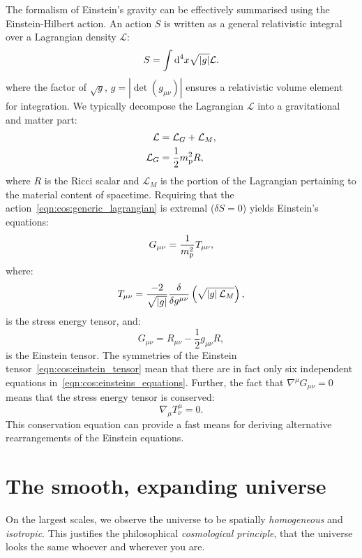 The formalism of Einstein's gravity can be effectively summarised using the Einstein-Hilbert action. An action $S$ is written as a general relativistic integral over a Lagrangian density $\mathcal{L}$:
\begin{equation}
  S = \int\d[4]{x} \sqrt{|g|} \mathcal{L}.
  \label{eqn:cos:generic_lagrangian}
\end{equation}
where the factor of $\sqrt{g}$, $g=\left|\det\left( g_{\mu\nu} \right)\right|$ ensures a relativistic volume element for integration.
We typically decompose the Lagrangian $\mathcal{L}$ into a gravitational and matter part:
\begin{align}
  \mathcal{L} &= \mathcal{L}_G + \mathcal{L}_M,
  \label{eqn:cos:decomp}\\
  \mathcal{L}_G &= \frac{1}{2} \m^2 R,
  \label{eqn:cos:L_grav}
\end{align}
where $R$ is the Ricci scalar and $\mathcal{L}_M$ is the portion of the Lagrangian pertaining to the material content of spacetime. Requiring that the action~\eqref{eqn:cos:generic_lagrangian} is extremal ($\delta S = 0$) yields Einstein's equations:
\begin{equation}
  G_{\mu\nu} = \frac{1}{\m^2}T_{\mu\nu},
  \label{eqn:cos:einsteins_equations}
\end{equation}
where:
\begin{equation}
  T_{\mu\nu} = \frac{-2}{\sqrt{\abs{g}}}\frac{\delta}{\delta g^{\mu\nu}}\left( \sqrt{\abs{g} \mathcal{L}_M} \right),
  \label{eqn:cos:SET_fundamantal}
\end{equation}
is the stress energy tensor, and:
\begin{equation}
  G_{\mu\nu} = R_{\mu\nu} - \frac{1}{2}g_{\mu\nu} R,
  \label{eqn:cos:einstein_tensor}
\end{equation}
is the Einstein tensor. The symmetries of the Einstein tensor~\eqref{eqn:cos:einstein_tensor} mean that there are in fact only six independent equations in~\eqref{eqn:cos:einsteins_equations}. Further, the fact that $\nabla^\mu G_{\mu\nu}=0$ means that the stress energy tensor is conserved:
\begin{equation}
  \nabla_\mu T^{\mu}_{\nu} = 0.
  \label{eqn:cos:SET_conservation}
\end{equation}
This conservation equation can provide a fast means for deriving alternative rearrangements of the Einstein equations.

\section{The smooth, expanding universe}
On the largest scales, we observe the universe to be spatially {\em homogeneous\/} and {\em isotropic}. This justifies the philosophical {\em cosmological principle}, that the universe looks the same whoever and wherever you are. 

